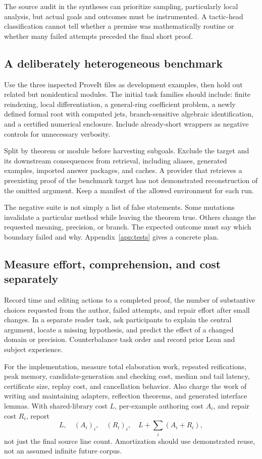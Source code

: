\documentclass[11pt,letterpaper]{article}
\theoremstyle{definition}
\theoremstyle{remark}
\begin{document}
The source audit in the syntheses can prioritize sampling, particularly local
analysis, but actual goals and outcomes must be instrumented. A tactic-head
classification cannot tell whether a premise was mathematically routine or
whether many failed attempts preceded the final short proof.

\subsection{A deliberately heterogeneous benchmark}
Use the three inspected ProveIt files as development examples, then hold out
related but nonidentical modules. The initial task families should include:
finite reindexing, local differentiation, a general-ring coefficient problem,
a newly defined formal root with computed jets, branch-sensitive algebraic
identification, and a certified numerical enclosure. Include already-short
wrappers as negative controls for unnecessary verbosity.

Split by theorem or module before harvesting subgoals. Exclude the target
and its downstream consequences from retrieval, including aliases, generated
examples, imported answer packages, and caches. A provider that retrieves a
preexisting proof of the benchmark target has not demonstrated reconstruction
of the omitted argument. Keep a manifest of the allowed environment for each
run.

The negative suite is not simply a list of false statements. Some mutations
invalidate a particular method while leaving the theorem true. Others change
the requested meaning, precision, or branch. The expected outcome must say
which boundary failed and why. Appendix~\ref{app:tests} gives a concrete plan.

\subsection{Measure effort, comprehension, and cost separately}
Record time and editing actions to a completed proof, the number of substantive
choices requested from the author, failed attempts, and repair effort after
small changes. In a separate reader task, ask participants to explain the
central argument, locate a missing hypothesis, and predict the effect of a
changed domain or precision. Counterbalance task order and record prior Lean
and subject experience.

For the implementation, measure total elaboration work, repeated reifications,
peak memory, candidate-generation and checking cost, median and tail latency,
certificate size, replay cost, and cancellation behavior. Also charge the work
of writing and maintaining adapters, reflection theorems, and generated interface
lemmas. With shared-library cost $L$, per-example authoring cost $A_i$, and
repair cost $R_i$, report
\[
 L,\quad (A_i)_i,\quad(R_i)_i,\quad
 L+\sum_i(A_i+R_i),
\]
not just the final source line count. Amortization should use demonstrated reuse,
not an assumed infinite future corpus.
\end{document}
